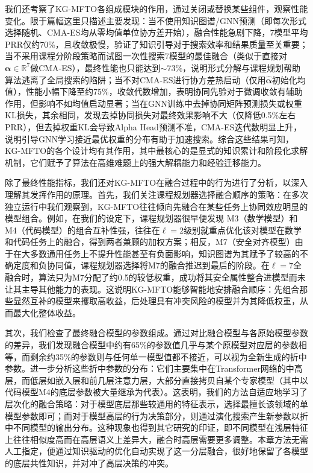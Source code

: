 \documentclass[../main.tex]{subfiles}
\begin{document}
我们还考察了KG-MFTO各组成模块的作用，通过关闭或替换某些组件，观察性能变化。限于篇幅这里只描述主要发现：当不使用知识图谱/GNN预测（即每次形式选择随机、CMA-ES均从零均值单位协方差开始），融合性能急剧下降，7模型平均PRR仅约70\%，且收敛极慢，验证了知识引导对于搜索效率和结果质量至关重要；当不采用课程分阶段策略而试图一次性搜索7模型的最佳融合（类似于直接对$\boldsymbol{\alpha}\in \mathbb{R}^7$做CMA-ES），最终性能也只能达到$\sim$73\%，说明形式分解与课程规划帮助算法逃离了全局搜索的陷阱；当不对CMA-ES进行协方差热启动（仅用$\hat{\boldsymbol{\alpha}}$初始化均值），性能小幅下降至约75\%，收敛代数增加，表明协同先验对于微调收敛有辅助作用，但影响不如均值启动显著；当在GNN训练中去掉协同矩阵预测损失或权重KL损失，其余相同，发现去掉协同损失对最终效果影响不大（仅降低0.5\%左右PRR），但去掉权重KL会导致Alpha Head预测不准，CMA-ES迭代数明显上升，说明引导GNN学习接近最优权重的分布有助于加速搜索。综合这些结果可知，KG-MFTO的各个设计均有其作用，其中最核心的是显式的知识累计和阶段化求解机制，它们赋予了算法在高维难题上的强大解耦能力和经验迁移能力。


除了最终性能指标，我们还对KG-MFTO在融合过程中的行为进行了分析，以深入理解其发挥作用的原理。首先，我们关注课程规划器选择融合顺序的策略：在多次独立运行中我们观察到，KG-MFTO往往倾向先融合在某些任务上协同效应明显的模型组合。例如，在我们的设定下，课程规划器很早便发现 M3（数学模型）和 M4（代码模型）的组合互补性强，往往在$\ell=2$级别就重点优化该对模型在数学和代码任务上的融合，得到两者兼顾的加权方案；相反，M7（安全对齐模型）由于在大多数通用任务上不提升性能甚至有负面影响，知识图谱为其赋予了较高的不确定度和负协同值，课程规划器选择将M7的融合推迟到最后的阶段。在$\ell=7$全融合时，算法只为M7分配了约0.5的较低权重，成功将其安全属性整合进模型而未让其主导其他能力的表现。这说明KG-MFTO能够智能地安排融合顺序：先组合那些显然互补的模型来攫取高收益，后处理具有冲突风险的模型并为其降低权重，从而最大化整体收益。

其次，我们检查了最终融合模型的参数组成。通过对比融合模型与各原始模型参数的差异，我们发现融合模型中约有65\%的参数值几乎与某个原模型对应层的参数相等，而剩余约35\%的参数则与任何单一模型值都不接近，可以视为全新生成的折中参数。进一步分析这些折中参数的分布：它们主要集中在Transformer网络的中高层，而低层如嵌入层和前几层注意力层，大部分直接拷贝自某个专家模型（其中以代码模型M4的底层参数被大量继承为代表）。这表明，我们的方法自适应地学习了层次化的融合策略：对于模型底层那些较通用的特征表示，选择最擅长该领域的单模型参数即可；而对于模型高层的行为决策部分，则通过演化搜索产生新参数以折中不同模型的输出分布。这种现象也得到其它研究的印证，即不同模型在浅层特征上往往相似度高而在高层语义上差异大，融合时高层需要更多调整。本章方法无需人工指定，便通过知识驱动的优化自动实现了这一分层融合，很好地保留了各模型的底层共性知识，并对冲了高层决策的冲突。
\end{document}
